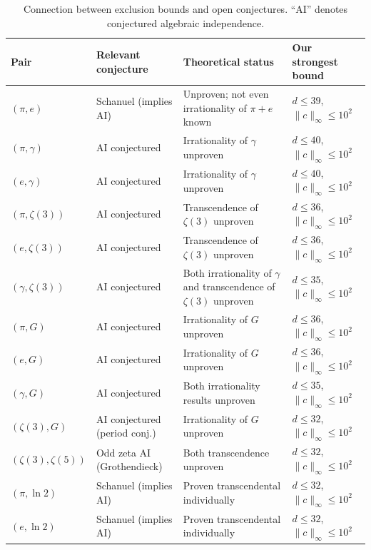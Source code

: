 \documentclass[11pt]{amsart}
\theoremstyle{remark}
\newcommand{\norm}[1]{\lVert #1 \rVert}
\begin{document}
\begin{table}[ht]
\centering
\caption{Connection between exclusion bounds and open conjectures.
``AI'' denotes conjectured algebraic independence.}\label{tab:conjectures}
\smallskip
\small
\begin{tabular}{@{}llp{3.5cm}p{2.8cm}@{}}
\toprule
Pair & Relevant conjecture & Theoretical status & Our strongest bound \\
\midrule
$(\pi, e)$
  & Schanuel (implies AI)
  & Unproven; not even irrationality of $\pi+e$ known
  & $d \le 39$, $\norm{c}_\infty \le 10^2$ \\
$(\pi, \gamma)$
  & AI conjectured
  & Irrationality of $\gamma$ unproven
  & $d \le 40$, $\norm{c}_\infty \le 10^2$ \\
$(e, \gamma)$
  & AI conjectured
  & Irrationality of $\gamma$ unproven
  & $d \le 40$, $\norm{c}_\infty \le 10^2$ \\
$(\pi, \zeta(3))$
  & AI conjectured
  & Transcendence of $\zeta(3)$ unproven
  & $d \le 36$, $\norm{c}_\infty \le 10^2$ \\
$(e, \zeta(3))$
  & AI conjectured
  & Transcendence of $\zeta(3)$ unproven
  & $d \le 36$, $\norm{c}_\infty \le 10^2$ \\
$(\gamma, \zeta(3))$
  & AI conjectured
  & Both irrationality of $\gamma$ and transcendence of $\zeta(3)$ unproven
  & $d \le 35$, $\norm{c}_\infty \le 10^2$ \\
$(\pi, G)$
  & AI conjectured
  & Irrationality of $G$ unproven
  & $d \le 36$, $\norm{c}_\infty \le 10^2$ \\
$(e, G)$
  & AI conjectured
  & Irrationality of $G$ unproven
  & $d \le 36$, $\norm{c}_\infty \le 10^2$ \\
$(\gamma, G)$
  & AI conjectured
  & Both irrationality results unproven
  & $d \le 35$, $\norm{c}_\infty \le 10^2$ \\
$(\zeta(3), G)$
  & AI conjectured (period conj.)
  & Irrationality of $G$ unproven
  & $d \le 32$, $\norm{c}_\infty \le 10^2$ \\
$(\zeta(3), \zeta(5))$
  & Odd zeta AI (Grothendieck)
  & Both transcendence unproven
  & $d \le 32$, $\norm{c}_\infty \le 10^2$ \\
$(\pi, \ln 2)$
  & Schanuel (implies AI)
  & Proven transcendental individually
  & $d \le 32$, $\norm{c}_\infty \le 10^2$ \\
$(e, \ln 2)$
  & Schanuel (implies AI)
  & Proven transcendental individually
  & $d \le 32$, $\norm{c}_\infty \le 10^2$ \\
\bottomrule
\end{tabular}
\end{table}
\end{document}
